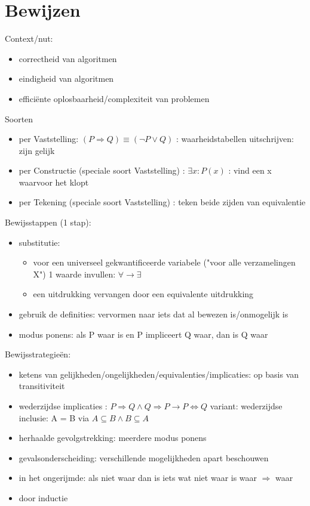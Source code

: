 \documentclass{article}
\begin{document}
\section{Bewijzen}
Context/nut:
\begin{itemize}
    \item correctheid van algoritmen
    \item eindigheid van algoritmen
    \item efficiënte oplosbaarheid/complexiteit van problemen
\end{itemize}
Soorten
\begin{itemize}
    \item per Vaststelling: $(P \Rightarrow Q) \equiv (\neg P \lor Q)$ : waarheidstabellen uitschrijven: zijn gelijk
    \item per Constructie (speciale soort Vaststelling) : $\exists x: P(x)$ : vind een x waarvoor het klopt
    \item per Tekening (speciale soort Vaststelling) : teken beide zijden van equivalentie  
\end{itemize}
Bewijsstappen (1 stap):
\begin{itemize}
    \item substitutie:
        \begin{itemize}
            \item voor een universeel gekwantificeerde variabele ("voor alle verzamelingen X") 1 waarde invullen: $\forall \rightarrow \exists$
            \item een uitdrukking vervangen door een equivalente uitdrukking
        \end{itemize}
    \item gebruik de definities: vervormen naar iets dat al bewezen is/onmogelijk is
    \item modus ponens: als P waar is en P impliceert Q waar, dan is Q waar
\end{itemize}
Bewijsstrategieën:
\begin{itemize}
    \item ketens van gelijkheden/ongelijkheden/equivalenties/implicaties: op basis van transitiviteit
    \item wederzijdse implicaties : $P \Rightarrow Q \land Q \Rightarrow P \rightarrow P \iff Q$
    \newline variant: wederzijdse inclusie: A = B via $A \subseteq B \land B \subseteq A$
    \item herhaalde gevolgstrekking: meerdere modus ponens
    \item gevalsonderscheiding: verschillende mogelijkheden apart beschouwen
    \item in het ongerijmde: als niet waar dan is iets wat niet waar is waar $\Rightarrow$ waar
    \item door inductie
\end{itemize}
\end{document}
